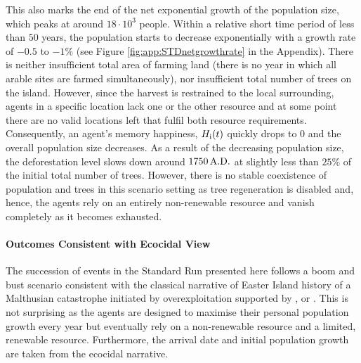 This also marks the end of the net exponential growth of the population size, which peaks at around $18\cdot 10^3$ people.
Within a relative short time period of less than $50$ years, the population starts to decrease exponentially with a growth rate of $-0.5$ to $-1\%$ (see Figure \ref{fig:app:STDnetgrowthrate} in the Appendix).
There is neither insufficient total area of farming land (there is no year in which all arable sites are farmed simultaneously), nor insufficient total number of trees on the island.
However, since the harvest is restrained to the local surrounding, agents in a specific location lack one or the other resource and at some point there are no valid locations left that fulfil both resource requirements.
Consequently, an agent's memory happiness, $H_{\rm i}(t)$ quickly drops to $0$ and the overall population size decreases.
As a result of the decreasing population size, the deforestation level slows down around $1750\, {\rm A.D.}$ at slightly less than $25\%$ of the initial total number of trees. 
However, there is no stable coexistence of population and trees in this scenario setting as tree regeneration is disabled and, hence, the agents rely on an entirely non-renewable resource and vanish completely as it becomes exhausted.


\paragraph{Outcomes Consistent with Ecocidal View}
The succession of events in the Standard Run presented here follows a boom and bust scenario consistent with the classical narrative of Easter Island history of a Malthusian catastrophe initiated by overexploitation supported by \citet{Brander1998}, \citet{Diamond2011} or \citet{Bahn2017}.
This is not surprising as the agents are designed to maximise their personal population growth every year but eventually rely on a non-renewable resource and a limited, renewable resource.
Furthermore, the arrival date and initial population growth are taken from the ecocidal narrative.


